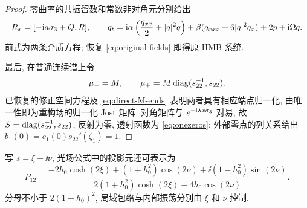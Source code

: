 \begin{proof}
零曲率的共振留数和常数非对角元分别给出
\begin{equation*}
R_x=[-\mathrm{i} a\sigma_3+Q,R],\qquad
q_t=\mathrm{i}\alpha\left(\dfrac{q_{xx}}{2}+|q|^2q\right)
+\beta(q_{xxx}+6|q|^2q_x)+2p+\mathrm{i}\Omega q.
\end{equation*}
前式为两条介质方程; 恢复 \eqref{eq:original-fields} 即得原 HMB 系统.

最后, 在普通连续谱上令
\begin{equation*}
\mu_-=M,\qquad
\mu_+=M\operatorname{diag}(s_{22}^{-1},s_{22}).
\end{equation*}
已恢复的修正空间方程及 \eqref{eq:direct-M-ends} 表明两者具有相应端点归一化, 由唯一性即为重构场的归一化 Jost 矩阵. 对角矩阵与 $e^{-\mathrm{i}\lambda x\sigma_3}$ 对易, 故 $S=\operatorname{diag}(s_{22}^{-1},s_{22})$, 反射为零, 透射函数为 \eqref{eq:onezeros}; 外部零点的列关系给出 $b_1(0)=c_1(0)s_{22}'(\zeta_1)=1$.
\end{proof}

\begin{remark}
写 $s=\xi+\ii\nu$, 光场公式中的投影元还可表示为
\begin{equation}\label{eq:hyperbolic-projector}
P_{12}=\dfrac{-2h_0\cosh(2\xi)+(1+h_0^2)\cos(2\nu)+\ii(1-h_0^2)\sin(2\nu)}
{2(1+h_0^2)\cosh(2\xi)-4h_0\cos(2\nu)}.
\end{equation}
分母不小于 $2(1-h_0)^2$, 局域包络与内部振荡分别由 $\xi$ 和 $\nu$ 控制.
\end{remark}

